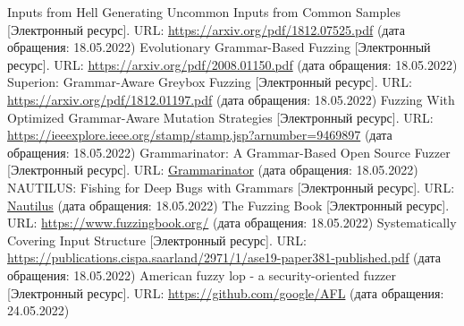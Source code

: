 \documentclass[a4paper]{article}
\begin{document}
\begin{thebibliography}{}
      Inputs from Hell Generating Uncommon Inputs from Common Samples [Электронный ресурс]. URL: \href{https://arxiv.org/pdf/1812.07525.pdf}{https://arxiv.org/pdf/1812.07525.pdf} (дата обращения: 18.05.2022)
      Evolutionary Grammar-Based Fuzzing [Электронный ресурс]. URL: \href{https://arxiv.org/pdf/2008.01150.pdf}{https://arxiv.org/pdf/2008.01150.pdf} (дата обращения: 18.05.2022)
      Superion: Grammar-Aware Greybox Fuzzing [Электронный ресурс]. URL: \href{https://arxiv.org/pdf/1812.01197.pdf}{https://arxiv.org/pdf/1812.01197.pdf} (дата обращения: 18.05.2022)
      Fuzzing With Optimized Grammar-Aware
    Mutation Strategies [Электронный ресурс]. URL: \href{https://ieeexplore.ieee.org/stamp/stamp.jsp?arnumber=9469897}{https://ieeexplore.ieee.org/stamp/stamp.jsp?arnumber=9469897} (дата обращения: 18.05.2022)
      Grammarinator:
    A Grammar-Based Open Source Fuzzer [Электронный ресурс]. 
    URL: \href{https://www.researchgate.net/publication/328510752\_Grammarinator\_a\_grammar-based\_open\_source\_fuzzer}{Grammarinator}
    (дата обращения: 18.05.2022)
      NAUTILUS:
    Fishing for Deep Bugs with Grammars [Электронный ресурс]. URL: \href{https://www.ndss-symposium.org/wp-content/uploads/2019/02/ndss2019\_04A-3\_Aschermann\_paper.pdf}{Nautilus} (дата обращения: 18.05.2022)
      The Fuzzing Book [Электронный ресурс]. URL: \href{https://www.fuzzingbook.org/}{https://www.fuzzingbook.org/} (дата обращения: 18.05.2022)
      Systematically Covering Input Structure [Электронный ресурс]. URL: \href{https://publications.cispa.saarland/2971/1/ase19-paper381-published.pdf}{https://publications.cispa.saarland/2971/1/ase19-paper381-published.pdf} (дата обращения: 18.05.2022)
      American fuzzy lop - a security-oriented fuzzer [Электронный ресурс]. URL: \href{https://github.com/google/AFL}{https://github.com/google/AFL} (дата обращения: 24.05.2022)
\end{thebibliography}
\end{document}
